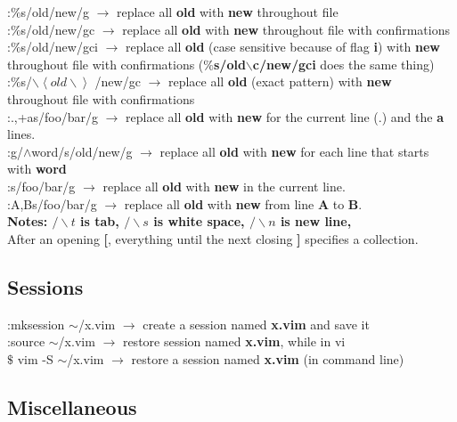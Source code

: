 \documentclass[twoside,a4paper]{article}
\newcommand{\tcc}{\color{cyan}}
\newcommand{\tcr}{\color{red}}
\newcommand{\tcg}{\color{gray}}
\newcommand{\tck}{\color{black}}
\newcommand{\ra }{$\rightarrow$ }
\begin{document}
\begin{multicols}{2}
			\tcr :$\%$s/old/new/g \tck $\rightarrow$
			replace all \textbf{old} with \textbf{new} throughout 
			file\\
			\tcr :$\%$s/old/new/gc \tck $\rightarrow$
			replace all \textbf{old} with \textbf{new} throughout 
			file with confirmations\\
			\tcr :$\%$s/old/new/gci \tck $\rightarrow$
			replace all \textbf{old} (case sensitive because of flag
			\textbf{i}) with \textbf{new} throughout file with
			confirmations (\textbf{$\%$s/old$\backslash$c/new/gci}
			does the same thing)\\
			\tcr :$\%$s/$\backslash\left< old \backslash 
			\right>$
			/new/gc \tck \ra replace all 
			\textbf{old} (exact pattern) with \textbf{new} 
			throughout file with confirmations\\
			\tcr :.,+as/foo/bar/g \tck $\rightarrow$
			replace all \textbf{old} with \textbf{new} for the 
			current line (.) and the \textbf{a} lines.\\
			\tcr :g/$\wedge$word/s/old/new/g \tck 
			\ra replace all \textbf{old} with \textbf{new}
			for each line that starts with \textbf{word}\\
			\tcr :s/foo/bar/g \tck \ra 
			replace all \textbf{old} with \textbf{new} in the 
			current line.\\
			\tcr :A,Bs/foo/bar/g \tck $\rightarrow$
			replace all \textbf{old} with \textbf{new} from line
			\textbf{A} to \textbf{B}.\\
			\tcg \textbf{Notes: $/\backslash t$ is tab, 
			$/\backslash s$ is white space, $/\backslash n$ is new 
			line, }\\
			After an opening \textbf{[}, everything until the next 
			closing \textbf{]} specifies a collection.

	\tcc \subsection{Sessions}

		\tcr :mksession $\sim$/x.vim \tck \ra 
		create a session named \textbf{x.vim} and save it\\
		\tcr :source $\sim$/x.vim \tck \ra 
		restore session named \textbf{x.vim}, while in vi\\
		\tcr $\$ $ vim -S $\sim$/x.vim \tck $\rightarrow$
		restore a session named \textbf{x.vim} (in command line)

		\tcc \subsection{Miscellaneous}


\end{multicols}
\end{document}

